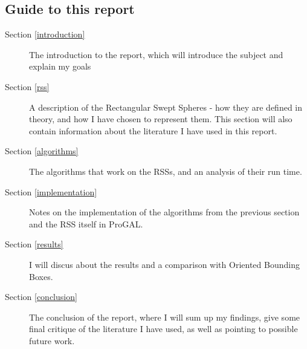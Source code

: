 \subsection{Guide to this report}
\begin{description}
\item[Section \ref{introduction}] The introduction to the report, which will introduce the subject and explain my goals
\item[Section \ref{rss}] A description of the Rectangular Swept Spheres - how they are defined in theory, and how I have chosen to represent them. This section will also contain information about the literature I have used in this report.
\item[Section \ref{algorithms}] The algorithms that work on the RSSs, and an analysis of their run time.
\item[Section \ref{implementation}] Notes on the implementation of the algorithms from the previous section and the RSS itself in ProGAL.
\item[Section \ref{results}] I will discus about the results and a comparison with Oriented Bounding Boxes. 
\item[Section \ref{conclusion}] The conclusion of the report, where I will sum up my findings, give some final critique of the literature I have used, as well as pointing to possible future work. 
\end{description}
